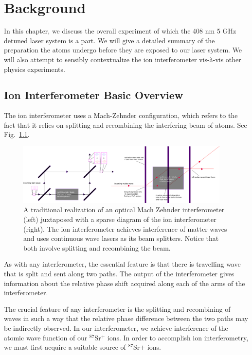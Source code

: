 
\chapter{Background}
In this chapter, we discuss the overall experiment of which the 408 nm 5 GHz detuned laser system is a part. We will give a detailed summary of the preparation the atoms undergo before they are exposed to our laser system. We will also attempt to sensibly contextualize the ion interferometer vis-\`a-vis other physics experiments. 

\section{Ion Interferometer Basic Overview}
The ion interferometer uses a Mach-Zehnder configuration, which refers to the fact that it relies on splitting and recombining the interfering beam of atoms. See Fig.\ \ref{mach-zehnder-fig}. 


\begin{figure}
\centerline{
\includegraphics[width=0.95\textwidth]{mach-zehnder_0v2}}
\caption[Optical and Matterwave Mach Zehnder interferometers]{\label{mach-zehnder-fig}A traditional realization of an optical Mach Zehnder interferometer (left) juxtaposed with a sparse diagram of the ion interferometer (right). The ion interferometer achieves interference of matter waves and uses continuous wave lasers as its beam splitters. Notice that both involve splitting and recombining the beam. }
\end{figure}


As with any interferometer, the essential feature is that there is travelling wave that is split and sent along two paths. The output of the interferometer gives information about the relative phase shift acquired along each of the arms of the interferometer. 

The crucial feature of any interferometer is the splitting and recombining of waves in such a way that the relative phase difference between the two paths may be indirectly observed. In our interferometer, we achieve interference of the atomic wave function of our $^{87}$Sr$^+$ ions. 
In order to accomplish ion interferometry, we must first acquire a suitable source of $^{87}$Sr$+$ ions. 

